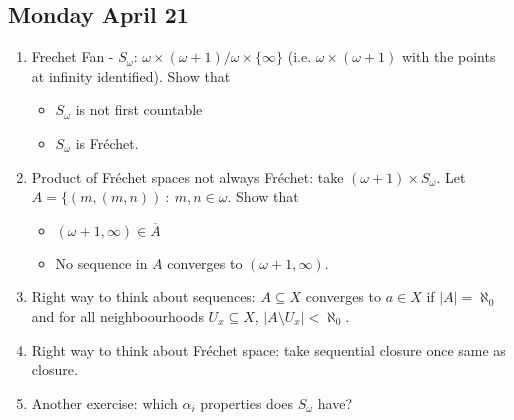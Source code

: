 \documentclass{article}
\begin{document}
\subsection*{Monday April 21} 
\begin{enumerate}
    \item Frechet Fan - \(S_{\omega}\): \(\omega \times (\omega + 1) / \omega \times \{\infty\}\) (i.e. \(\omega \times ( \omega + 1)\) with the points at infinity identified). Show that 
    \begin{itemize}
        \item \(S_{\omega}\) is not first countable \checkmark
        \item \(S_{\omega}\) is Fréchet. \checkmark
    \end{itemize}

    \item Product of Fréchet spaces not always Fréchet: take \((\omega + 1) \times S_{\omega}\). Let \(A = \{(m, (m, n)) \: : \: m,n \in \omega\). Show that 
    \begin{itemize}
        \item \((\omega + 1, \infty) \in \overline{A}\) \checkmark
        \item No sequence in \(A\) converges to \((\omega + 1, \infty)\). \checkmark
    \end{itemize}

    \item Right way to think about sequences: \(A \subseteq X\) converges to \(a \in X\) if \(|A| = \aleph_0\) and for all neighboourhoods \(U_x \subseteq X\), \(|A \setminus U_x| < \aleph_0\).
    
    \item Right way to think about Fréchet space: take sequential closure once same as closure.
    \item Another exercise: which \(\alpha_i\) properties does \(S_{\omega}\) have? \checkmark
\end{enumerate}
\end{document}
